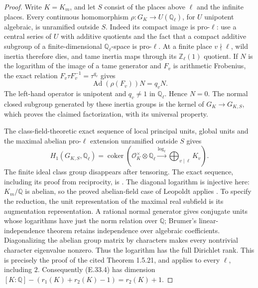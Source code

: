 \begin{proof}
Write $K=K_m$, and let $S$ consist of the places above $\ell$ and
the infinite places. Every continuous homomorphism
$\rho:G_K\to U(\mathbb Q_\ell)$, for $U$ unipotent algebraic,
is unramified outside $S$. Indeed its compact image is pro-$\ell$:
use a central series of $U$ with additive quotients and the fact
that a compact additive subgroup of a finite-dimensional
$\mathbb Q_\ell$-space is pro-$\ell$. At a finite place $v\nmid\ell$,
wild inertia therefore dies, and tame inertia maps through its
$\mathbb Z_\ell(1)$ quotient. If $N$ is the logarithm of the image
of a tame generator and $F_v$ is arithmetic Frobenius, the exact
relation $F_v\tau F_v^{-1}=\tau^{q_v}$ gives
\[
 \operatorname{Ad}(\rho(F_v))N=q_v N.
\]
The left-hand operator is unipotent and $q_v\ne1$ in
$\mathbb Q_\ell$. Hence $N=0$. The normal closed subgroup generated
by these inertia groups is the kernel of $G_K\to G_{K,S}$,
which proves the claimed factorization, with its universal property.

The class-field-theoretic exact sequence of local principal units,
global units and the maximal abelian pro-$\ell$ extension unramified
outside $S$ gives
\[
 H_1(G_{K,S},\mathbb Q_\ell)
 =\operatorname{coker}\left(
 \mathcal O_K^{\times}\otimes\mathbb Q_\ell
 \xrightarrow{\log_\ell}
 \bigoplus_{v\mid\ell}K_v\right).                       \tag{E.33.4}
\]
The finite ideal class group disappears after tensoring. The exact
sequence, including its proof from reciprocity, is
\cite[Theorem 1.5.4 and Theorem 1.5.7]{E_SharifiIwasawa}.
The diagonal logarithm is injective here: $K_m/\mathbb Q$ is
abelian, so the proved abelian-field case of Leopoldt applies
\cite[Theorems1.5.17 and 1.5.21]{E_SharifiIwasawa}.
To specify the reduction, the unit representation of the maximal
real subfield is its augmentation representation. A rational
normal generator gives conjugate units whose logarithms have just
the norm relation over $\mathbb Q$; Brumer's linear-independence
theorem retains independence over algebraic coefficients.
Diagonalizing the abelian group matrix by characters makes every
nontrivial character eigenvalue nonzero. Thus the logarithm has
the full Dirichlet rank. This is precisely the proof of the cited
Theorem 1.5.21, and applies to every $\ell$, including $2$.
Consequently (E.33.4) has dimension
$[K:\mathbb Q]-(r_1(K)+r_2(K)-1)=r_2(K)+1$.


\end{proof}
